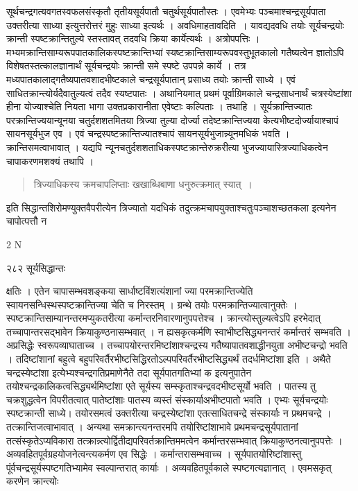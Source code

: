 \documentclass[11pt, openany]{book}
\begin{document}
\noindent सूर्थचन्द्रगत्यवगतस्वफलसंस्कृतौ तृतीयसूर्यपातौ चतुर्थसूर्यपातौस्तः । एवमेभ्यः पञ्चमाश्चन्द्रसूर्यपाता उक्तरीत्या साध्या इत्युत्तरोत्तरं मुहुः साध्या इत्यर्थः । अवधिमाह\textendash तावदिति~। यावद्यदवधि तयोः सूर्यचन्द्रयोः क्रान्ती स्पष्टक्रान्तितुल्ये स्तस्तावत् तदवधि क्रिया कार्येत्यर्थः । अत्रोपपत्तिः । मभ्यमक्रान्तिसाम्यरूपपातकालिकस्पष्टक्रान्तिभ्यां स्यष्टक्रान्तिसाम्यरूपवस्तुभूतकालो गतैष्यत्वेन ज्ञातोऽपि विशेषतस्तत्कालज्ञानार्थं सूर्यचन्द्रयोः क्रान्ती समे स्पष्टे उपपन्ने कार्ये । तत्र मध्यपातकालाद्गतैष्यपातवशादभीष्टकाले चन्द्रसूर्यपातान् प्रसाध्य तयोः क्रान्ती साध्ये । एवं साधितक्रान्त्योर्यदैवातुल्यत्वं तदैव स्यष्टपातः । अथानियमात् प्रथमं पूर्वाग्रिमकाले चन्द्रसाधनार्थं चत्रस्येष्टांशा हीना योज्याश्चेति नियता भागा उक्तप्रकारानीता एवेष्टाः कल्पिताः । तथाहि । सूर्यक्रान्तिज्यातः परक्रान्तिज्ययान्यूनया चतुर्दशशतमितया त्रिज्या तुल्या दोर्ज्या तदेष्टक्रान्तिज्यया केत्यभीष्टदोर्ज्यायाश्चापं सायनसूर्यभुज एव । एवं चन्द्रस्पष्टक्रान्तिज्यातश्चापं सायनसूर्यभुजान्न्यूनमधिकं भवति । क्रान्तिसमत्वाभावात् । यद्यपि न्यूनचतुर्दशशताधिकस्पष्टक्रान्तेरुक्ररीत्या भुजज्यायास्त्रिज्याधिकत्वेन चापाकरणमशक्यं तथापि ।

\begin{quote}
{\qt त्रिज्याधिकस्य क्रमचापलिप्ताः खखाब्धिबाणा धनुरुत्क्रमात् स्यात्~। }
\end{quote}
इति सिद्धान्तशिरोमण्युक्तवैपरीत्येन त्रिज्यातो यदधिकं तदुत्क्रमचापयुक्ताश्चतुःपञ्चाशच्छतकला इत्यनेन चापोत्पत्तौ न
%

{\tiny{2 N}}


\newpage


\noindent २८२ \hspace{4cm} सूर्यसिद्धान्तः
\vspace{1cm}


\noindent क्षतिः । एतेन चापासम्भवशङ्कया सार्धाष्टविंशत्यंशानां ज्या परमक्रान्तिज्येति स्वायनसन्धिस्थस्पष्टक्रान्तिज्या चेति च निरस्तम् । ग्रन्थे तयोः परमक्रान्तिज्यात्वानुक्तेः । स्पष्टक्रान्तिसाम्यानन्तरमप्युकतरीत्या कर्मान्तरनिवारणानुपपत्तेश्च । क्रान्त्योस्तुल्यत्वेऽपि हरभेदात् तच्चापान्तरसद्भावेन क्रियाकुण्ठनासम्भवात् । न ह्यसकृत्कर्मणि स्वाभीष्टसिद्ध्यनन्तरं कर्मान्तरं सम्भवति । अप्रसिद्धेः स्वरूपव्याघाताच्च । तच्चापयोरन्तरमिष्टांशाश्चन्द्रस्य गतैष्यापातवशाद्धीनयुता अभीष्टचन्द्रो भवति । तदिष्टांशानां बहुत्वे बहुपरिवर्तैरभीष्टसिद्धिरतोऽल्पपरिवर्तैरभीष्टसिद्ध्यर्थं तदर्धमिष्टांशा इति । अथैते चन्द्रस्येष्टांशा इत्येभ्यश्चन्द्रगतिप्रमाणेनैते तदा सूर्यपातगतिभ्यां क इत्यनुपातेन तयोश्चन्द्रकालिकत्वसिद्ध्यर्थमिष्टांशा एते सूर्यस्य सम्स्कृताश्चन्द्रवदभीष्टसूर्यो भवति । पातस्य तु चक्रशुद्धत्वेन विपरीतत्वात् पातेष्टांशाः पातस्य व्यस्तं संस्कार्याअभीष्टपातो भवति । एभ्यः सूर्यचन्द्रयोः स्पष्टक्रान्ती साध्ये। तयोरसमत्वं उक्तरीत्या चन्द्रस्येष्टांशा एतत्साधितचन्द्रे संस्कार्याः न प्रथमचन्द्रे । तत्क्रान्तिजत्वाभावात् । अन्यथा समक्रान्त्यनन्तरमपि तयोरिष्टांशाभावे प्रथमचन्द्रसूर्यपातानां तत्संस्कृतेऽप्यविकारा तत्क्रान्न्त्योर्द्वितीद्यपरिवर्तक्रान्तिममत्वेन कर्मान्तरसम्भवात् क्रियाकुण्ठनत्वानुपपत्तेः । अव्यवहितपूर्वग्रहयोजनेत्वन्त्यकर्मण एव सिद्धेः । कर्मान्तरासम्भवाच्च । सूर्यपातयोरिष्टांशास्तु पूंर्वचन्द्रसूर्यस्पष्टगतिभ्यामेव स्वल्पान्तरात् कार्याः । अव्यवहितपूर्वकाले स्पष्टगत्यज्ञानात् । एवमसकृत् करणेन क्रान्त्योः \textendash
\end{document}
